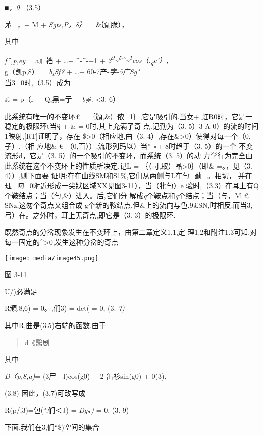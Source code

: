 \documentclass{article}
\begin{document}
\emph{■，0} （3.5）

茅=，+ M + \emph{Sgts,P，8｝} = \&頒,脆），

其中

\emph{f\^{},p,ey} = a』裆 + \ldots{}+ \^{}-\^{}-+1 +
\emph{3\textsuperscript{9}\textasciitilde{}\textsuperscript{5}\^{}\textasciitilde{}\textsuperscript{1}cos（.\textsubscript{q}e'）,\\
}g（凯p,8） = \emph{b\textsubscript{t}Sf?} + \ldots{}+
60-7产-\emph{字-5广Sg"\\
}当3=0时,（3.5）成为

£ = p（l --- Q,黑=亍 + \emph{b\#.} \textless{}3. 6）

此系统有唯一的不变环£= ｛頒,\&）侬=1｝,它是吸引的.当女+
虹R0时，它是一稳定的极限环t当§ + \& = 0时,其上充满了奇 点.记勤为（3.
5）3 A 0）的流的时间1映射,{[}RT{]}证明了，存在
\$\textgreater{}0（相应地,由（3.
4）,存在\&\textgreater{}0）使得对每一个（0,孑）,（相 应地\& €
（0,百））,流形列玛以）当''-»+ 8时趋于（3. 5）的一个 不变流形d，它是（3.
5）的一个吸引的不变环，而系统（3. 5）的动
力学行为完全由此系统在这个不变环上的性质所决定.记L =
｛（司,取）晶\textgreater{}0｝（即\& =。，见（3. 4））,则下面要
证明:存在曲线SM和S1\%,它们从两侧与L在勻=蓟=。相切，
并在珏=叼=0附近形成一尖狀区域XX见图3-11），当（牝勻）e
验\textbar{}时,（3.3）在耳上有Q个鞍结点；当（勻,\&）进入。后,它们分
解成\emph{q}个鞍点和\emph{q}个结点；当（与，M £ SNz,这匆个奇点又组合成
g个新的鞍结点,但\&上的流向与色,9£SN,时相反;而当3,
弓）在。之外时，耳上无奇点,即它是（3. 3）的极限环.

既然奇点的分岔现象发生在不变环上，由第二章定义1.1,定
理1.2和附注1.3可知,对每一固定的\^{}\textgreater{}0,发生这种分岔的奇点

\texttt{[image: media/image45.png]}

图 3-11

U/)必满足

R頒,8,6) = 0。,们3) = det( = 0, (3. \emph{7)}

其中R,曲是(3.5)右端的函数.由于

\begin{quote}
d《醫剧=
\end{quote}

其中

\emph{D〈p,8,a)}= (3尸---l)cos(g0) + 2 缶衫sin(g0) + 0(3).

(3.8) 因此，(3.7)可改写成

R(p/,3)=包(°,们＜J) = \emph{Dg。)} = 0. (3. 9)

下面,我们在3,们``\$)空间的集合
\end{document}
